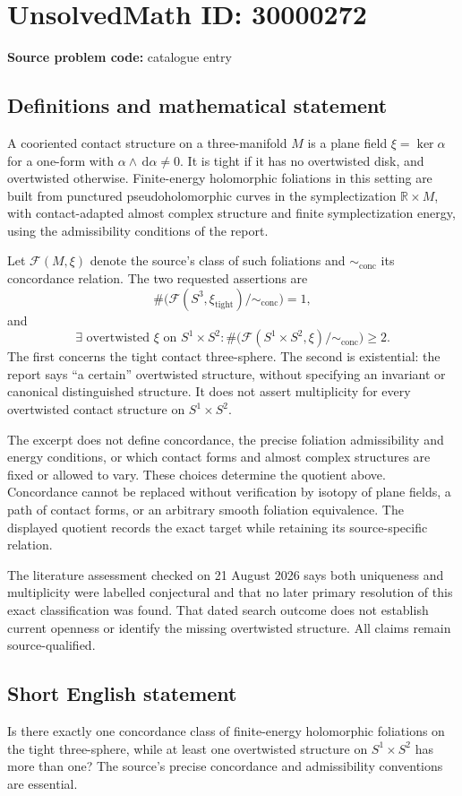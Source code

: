 \documentclass[11pt]{article}
\newcommand{\R}{\mathbb{R}}
\newcommand{\dd}{\,\mathrm{d}}
\begin{document}
\section*{UnsolvedMath ID: 30000272}
\textbf{Source problem code:} catalogue entry
\subsection{Definitions and mathematical statement}
A cooriented contact structure on a three-manifold $M$ is a plane field $\xi=\ker\alpha$ for a one-form with $\alpha\wedge\dd\alpha\ne0$. It is tight if it has no overtwisted disk, and overtwisted otherwise. Finite-energy holomorphic foliations in this setting are built from punctured pseudoholomorphic curves in the symplectization $\R\times M$, with contact-adapted almost complex structure and finite symplectization energy, using the admissibility conditions of the report.

Let $\mathscr F(M,\xi)$ denote the source's class of such foliations and $\sim_{\mathrm{conc}}$ its concordance relation. The two requested assertions are
\[
 \#\bigl(\mathscr F(S^3,\xi_{\mathrm{tight}})/\!\sim_{\mathrm{conc}}\bigr)=1,
\]
and
\[
 \exists\text{ overtwisted }\xi\text{ on }S^1\times S^2:
 \#\bigl(\mathscr F(S^1\times S^2,\xi)/\!\sim_{\mathrm{conc}}\bigr)\ge2.
\]
The first concerns the tight contact three-sphere. The second is existential: the report says ``a certain'' overtwisted structure, without specifying an invariant or canonical distinguished structure. It does not assert multiplicity for every overtwisted contact structure on $S^1\times S^2$.

The excerpt does not define concordance, the precise foliation admissibility and energy conditions, or which contact forms and almost complex structures are fixed or allowed to vary. These choices determine the quotient above. Concordance cannot be replaced without verification by isotopy of plane fields, a path of contact forms, or an arbitrary smooth foliation equivalence. The displayed quotient records the exact target while retaining its source-specific relation.

The literature assessment checked on 21 August 2026 says both uniqueness and multiplicity were labelled conjectural and that no later primary resolution of this exact classification was found. That dated search outcome does not establish current openness or identify the missing overtwisted structure. All claims remain source-qualified.
\subsection{Short English statement}
Is there exactly one concordance class of finite-energy holomorphic foliations on the tight three-sphere, while at least one overtwisted structure on $S^1\times S^2$ has more than one? The source's precise concordance and admissibility conventions are essential.
\end{document}

